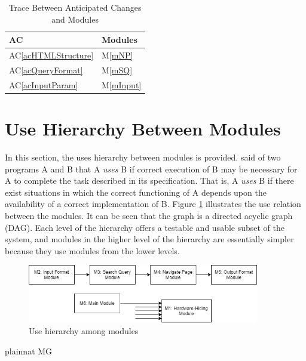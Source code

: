 \documentclass[12pt, titlepage]{article}
\newcommand{\acref}[1]{AC\ref{#1}}
\newcommand{\mref}[1]{M\ref{#1}}
\begin{document}
\begin{table}[H]
\centering
\begin{tabular}{p{} p{}}
\toprule
\textbf{AC} & \textbf{Modules}\\
\midrule
\acref{acHTMLStructure} & \mref{mNP}\\
\acref{acQueryFormat} & \mref{mSQ}\\
\acref{acInputParam} & \mref{mInput}\\
\bottomrule
\end{tabular}
\caption{Trace Between Anticipated Changes and Modules}
\label{table:tracechanges}
\label{TblACT}
\end{table}

\section{Use Hierarchy Between Modules} \label{SecUse}

In this section, the uses hierarchy between modules is
provided. \citet{Parnas1978} said of two programs A and B that A {\em uses} B if
correct execution of B may be necessary for A to complete the task described in
its specification. That is, A {\em uses} B if there exist situations in which
the correct functioning of A depends upon the availability of a correct
implementation of B.  Figure \ref{FigUH} illustrates the use relation between
the modules. It can be seen that the graph is a directed acyclic graph
(DAG). Each level of the hierarchy offers a testable and usable subset of the
system, and modules in the higher level of the hierarchy are essentially simpler
because they use modules from the lower levels.

\begin{figure}[H]
\centering
\includegraphics[width=0.9\textwidth]{UsesHierarchy.png}
\caption{Use hierarchy among modules}
\label{FigUH}
\end{figure}


 {plainnat}
 {MG}
\end{document}
